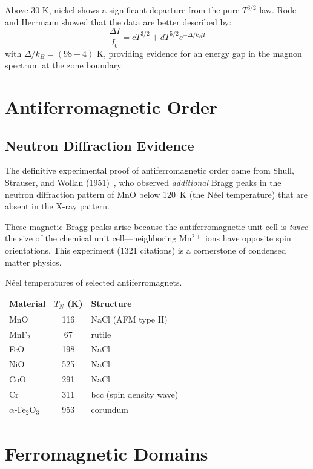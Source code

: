 Above 30 K, nickel shows a significant departure from the pure $T^{3/2}$ law. Rode and Herrmann showed that the data are better described by:
\begin{equation}
  \frac{\Delta I}{I_0} = cT^{3/2} + dT^{5/2}e^{-\Delta/k_BT}
\end{equation}
with $\Delta/k_B = (98 \pm 4)$ K, providing evidence for an energy gap in the magnon spectrum at the zone boundary.

\section{Antiferromagnetic Order}

\subsection{Neutron Diffraction Evidence}

The definitive experimental proof of antiferromagnetic order came from Shull, Strauser, and Wollan (1951)~\cite{shull1951neutron}, who observed \textit{additional} Bragg peaks in the neutron diffraction pattern of MnO below \SI{120}{\kelvin} (the N\'eel temperature) that are absent in the X-ray pattern.

These magnetic Bragg peaks arise because the antiferromagnetic unit cell is \textit{twice} the size of the chemical unit cell---neighboring Mn$^{2+}$ ions have opposite spin orientations. This experiment (1321 citations) is a cornerstone of condensed matter physics.

\begin{table}[H]
\centering
\caption{N\'eel temperatures of selected antiferromagnets.}
\label{tab:neel}
\begin{tabular}{@{}lSl@{}}
\toprule
Material & {$T_N$ (\si{\kelvin})} & Structure \\
\midrule
MnO   & 116  & NaCl (AFM type II) \\
MnF$_2$ & 67 & rutile \\
FeO   & 198  & NaCl \\
NiO   & 525  & NaCl \\
CoO   & 291  & NaCl \\
Cr    & 311  & bcc (spin density wave) \\
$\alpha$-Fe$_2$O$_3$ & 953 & corundum \\
\bottomrule
\end{tabular}
\end{table}

\section{Ferromagnetic Domains}

